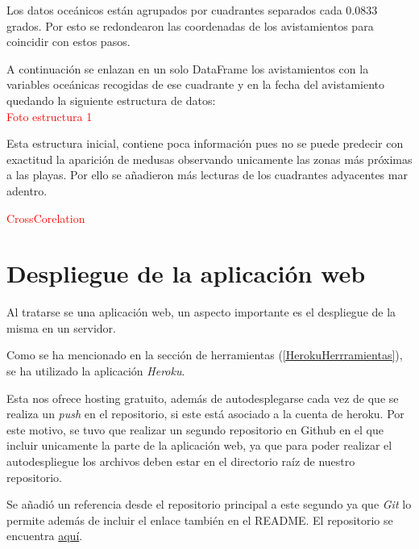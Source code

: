 Los datos oceánicos están agrupados por cuadrantes separados cada \num{0,0833} grados. Por esto se redondearon las coordenadas de los avistamientos para coincidir con estos pasos. 

A continuación se enlazan en un solo DataFrame los avistamientos con la variables oceánicas recogidas de ese cuadrante y en la fecha del avistamiento quedando la siguiente estructura de datos:\\
\textcolor{red}{Foto estructura 1}

Esta estructura inicial, contiene poca información pues no se puede predecir con exactitud la aparición de medusas observando unicamente las zonas más próximas a las playas. Por ello se añadieron más lecturas de los cuadrantes adyacentes mar adentro.


\textcolor{red}{CrossCorelation}


\section{Despliegue de la aplicación web}
Al tratarse se una aplicación web, un aspecto importante es el despliegue de la misma en un servidor.

Como se ha mencionado en la sección de herramientas (\ref{HerokuHerrramientas}), se ha utilizado la aplicación \emph{Heroku}.

Esta nos ofrece hosting gratuito, además de autodesplegarse cada vez de que se realiza un \emph{push} en el repositorio, si este está asociado a la cuenta de heroku. Por este motivo, se tuvo que realizar un segundo repositorio en Github en el que incluir unicamente la parte de la aplicación web, ya que para poder realizar el autodespliegue los archivos deben estar en el directorio raíz de nuestro repositorio.

Se añadió un referencia desde el repositorio principal a este segundo ya que \emph{Git} lo permite además de incluir el enlace también en el README. El repositorio se encuentra  \href{https://github.com/psnti/WebJellyfishForecast#tfg---pablo-santidrian-tudanca}{aquí}.


